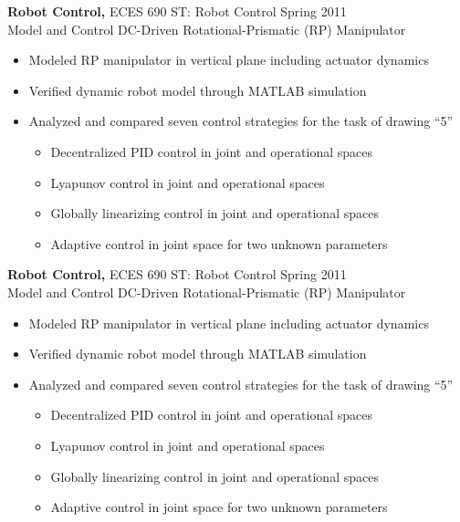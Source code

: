 \documentclass[margin]{res}
\begin{document}
\begin{resume}
\begin{tech}
\begin{controls}
{\bf Robot Control,} ECES 690 ST: Robot Control \hfill Spring 2011 \\
Model and Control DC-Driven Rotational-Prismatic (RP) Manipulator
\begin{itemize} \itemsep -2pt %
	\item Modeled RP manipulator in vertical plane including actuator dynamics
	\item Verified dynamic robot model through MATLAB simulation 
	\item Analyzed and compared seven control strategies for the task of drawing ``5''
		\vspace{-2mm}
		\begin{itemize} \itemsep -2pt %
		\item Decentralized PID control in joint and operational spaces
		\item Lyapunov control in joint and operational spaces
		\item Globally linearizing control in joint and operational spaces
		\item Adaptive control in joint space for two unknown parameters
		\end{itemize} \vspace{-2mm}
\end{itemize}
\end{controls}
\end{tech}
\begin{general}
{\bf Robot Control,} ECES 690 ST: Robot Control \hfill Spring 2011 \\
Model and Control DC-Driven Rotational-Prismatic (RP) Manipulator
\begin{itemize} \itemsep -2pt %
	\item Modeled RP manipulator in vertical plane including actuator dynamics
	\item Verified dynamic robot model through MATLAB simulation 
	\item Analyzed and compared seven control strategies for the task of drawing ``5''
		\vspace{-2mm}
		\begin{itemize} \itemsep -2pt %
		\item Decentralized PID control in joint and operational spaces
		\item Lyapunov control in joint and operational spaces
		\item Globally linearizing control in joint and operational spaces
		\item Adaptive control in joint space for two unknown parameters
		\end{itemize} \vspace{-2mm}
\end{itemize}
\end{general}


\end{resume}
\end{document}

